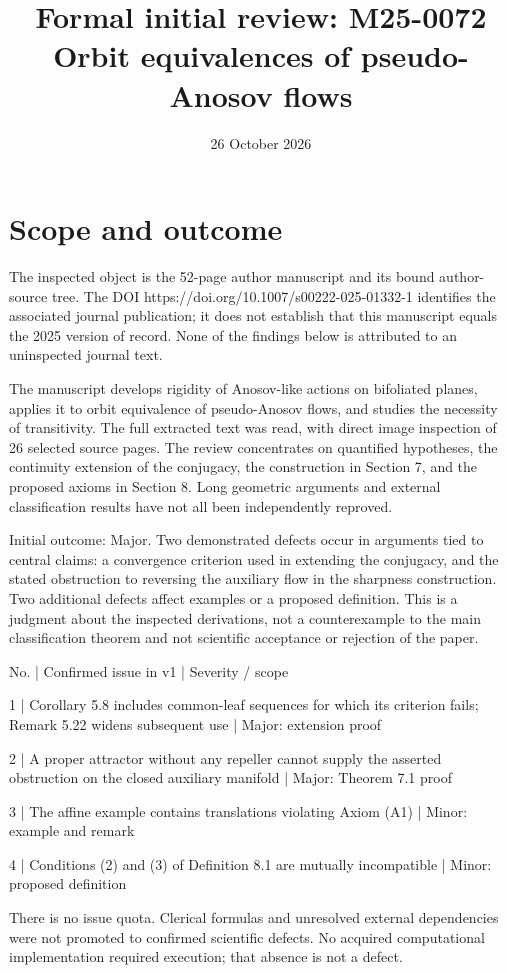 \documentclass[10pt]{article}
\title{Formal initial review: M25-0072
Orbit equivalences of pseudo-Anosov flows}
\author{}
\date{26 October 2026}
\begin{document}
\maketitle
\section*{Scope and outcome}
The inspected object is the 52-page author manuscript and its bound author-source tree. The DOI https://doi.org/10.1007/s00222-025-01332-1 identifies the associated journal publication; it does not establish that this manuscript equals the 2025 version of record. None of the findings below is attributed to an uninspected journal text.\par
The manuscript develops rigidity of Anosov-like actions on bifoliated planes, applies it to orbit equivalence of pseudo-Anosov flows, and studies the necessity of transitivity. The full extracted text was read, with direct image inspection of 26 selected source pages. The review concentrates on quantified hypotheses, the continuity extension of the conjugacy, the construction in Section 7, and the proposed axioms in Section 8. Long geometric arguments and external classification results have not all been independently reproved.\par
Initial outcome: Major. Two demonstrated defects occur in arguments tied to central claims: a convergence criterion used in extending the conjugacy, and the stated obstruction to reversing the auxiliary flow in the sharpness construction. Two additional defects affect examples or a proposed definition. This is a judgment about the inspected derivations, not a counterexample to the main classification theorem and not scientific acceptance or rejection of the paper.\par
No. | Confirmed issue in v1 | Severity / scope\par
1 | Corollary 5.8 includes common-leaf sequences for which its criterion fails; Remark 5.22 widens subsequent use | Major: extension proof\par
2 | A proper attractor without any repeller cannot supply the asserted obstruction on the closed auxiliary manifold | Major: Theorem 7.1 proof\par
3 | The affine example contains translations violating Axiom (A1) | Minor: example and remark\par
4 | Conditions (2) and (3) of Definition 8.1 are mutually incompatible | Minor: proposed definition\par
There is no issue quota. Clerical formulas and unresolved external dependencies were not promoted to confirmed scientific defects. No acquired computational implementation required execution; that absence is not a defect.\par
\end{document}
